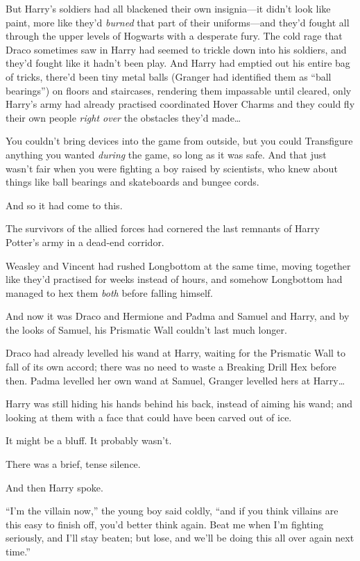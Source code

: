 But Harry’s soldiers had all blackened their own insignia—it didn’t look like paint, more like they’d \emph{burned} that part of their uniforms—and they’d fought all through the upper levels of Hogwarts with a desperate fury. The cold rage that Draco sometimes saw in Harry had seemed to trickle down into his soldiers, and they’d fought like it hadn’t been play. And Harry had emptied out his entire bag of tricks, there’d been tiny metal balls (Granger had identified them as “ball bearings”) on floors and staircases, rendering them impassable until cleared, only Harry’s army had already practised coordinated Hover Charms and they could fly their own people \emph{right over} the obstacles they’d made…

You couldn’t bring devices into the game from outside, but you could Transfigure anything you wanted \emph{during} the game, so long as it was safe. And that just wasn’t fair when you were fighting a boy raised by scientists, who knew about things like ball bearings and skateboards and bungee cords.

And so it had come to this.

The survivors of the allied forces had cornered the last remnants of Harry Potter’s army in a dead-end corridor.

Weasley and Vincent had rushed Longbottom at the same time, moving together like they’d practised for weeks instead of hours, and somehow Longbottom had managed to hex them \emph{both} before falling himself.

And now it was Draco and Hermione and Padma and Samuel and Harry, and by the looks of Samuel, his Prismatic Wall couldn’t last much longer.

Draco had already levelled his wand at Harry, waiting for the Prismatic Wall to fall of its own accord; there was no need to waste a Breaking Drill Hex before then. Padma levelled her own wand at Samuel, Granger levelled hers at Harry…

Harry was still hiding his hands behind his back, instead of aiming his wand; and looking at them with a face that could have been carved out of ice.

It might be a bluff. It probably wasn’t.

There was a brief, tense silence.

And then Harry spoke.

“I’m the villain now,” the young boy said coldly, “and if you think villains are this easy to finish off, you’d better think again. Beat me when I’m fighting seriously, and I’ll stay beaten; but lose, and we’ll be doing this all over again next time.”

